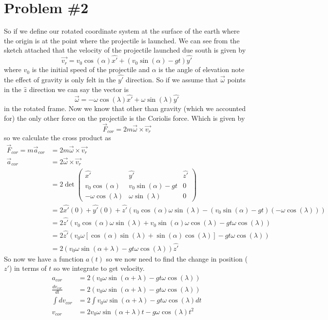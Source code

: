 \documentclass[11pt]{article}
\numberwithin{equation}{section}
\newcommand{\vecF}{\vec{F}}
\newcommand{\vecomg}{\vec{\omega}}
\begin{document}
\section{Problem \#2}
So if we define our rotated coordinate system at the surface of the earth where the origin is at the point where the projectile is launched. We can see from the sketch attached that the velocity of the projectile launched due south is given by
$$\vec{v_r} = v_0\cos(\alpha)\hat{x'}+(v_0\sin(\alpha)-gt)\hat{y'}$$
where $v_0$ is the initial speed of the projectile and $\alpha$ is the angle of elevation note the effect of gravity is only felt in the $\hat{y'}$ direction. So if we assume that $\vecomg$ points in the $\hat{z}$ direction we can say the vector is 
$$\vecomg = -\omega\cos(\lambda)\hat{x'} + \omega\sin(\lambda)\hat{y'}$$
in the rotated frame. Now we know that other than gravity (which we accounted for) the only other force on the projectile is the Coriolis force. Which is given by
$$\vecF_{cor} = 2m\vecomg\times\vec{v_r}$$
so we calculate the cross product as
\begin{align*}
\vecF_{cor} = m\vec{a}_{cor}&= 2m\vecomg\times\vec{v_r}\\
\vec{a}_{cor}&= 2\vecomg\times\vec{v_r}\\
&= 2\det\left(\begin{array}{ccc}
	\hat{x'}		&\hat{y'}		&\hat{z'}\\
	v_0\cos(\alpha)		&v_0\sin(\alpha)-gt	&0\\
	-\omega\cos(\lambda)	&\omega\sin(\lambda)	&0
	\end{array}\right)\\
&= 2\hat{x'}(0) + \hat{y'}(0) + \hat{z'}(v_0\cos(\alpha)\omega\sin(\lambda)-(v_0\sin(\alpha)-gt)(-\omega\cos(\lambda)))\\
&= 2\hat{z'}(v_0\cos(\alpha)\omega\sin(\lambda)+v_0\sin(\alpha)\omega\cos(\lambda)-gt\omega\cos(\lambda))\\
&= 2\hat{z'}(v_0\omega[\cos(\alpha)\sin(\lambda)+\sin(\alpha)\cos(\lambda)]-gt\omega\cos(\lambda))\\
&= 2(v_0\omega\sin(\alpha+\lambda)-gt\omega\cos(\lambda))\hat{z'}
\end{align*}
So now we have a function $a(t)$ so we now need to find the change in position ($z'$) in terms of $t$ so we integrate to get velocity.
\begin{align*}
a_{cor} &= 2(v_0\omega\sin(\alpha+\lambda)-gt\omega\cos(\lambda))\\
\frac{dv_{cor}}{dt} &= 2(v_0\omega\sin(\alpha+\lambda)-gt\omega\cos(\lambda))\\
\int dv_{cor} &= 2\int v_0\omega\sin(\alpha+\lambda)-gt\omega\cos(\lambda)dt\\
v_{cor} &= 2v_0\omega\sin(\alpha+\lambda)t-g\omega\cos(\lambda)t^2
\end{align*}
\end{document}
